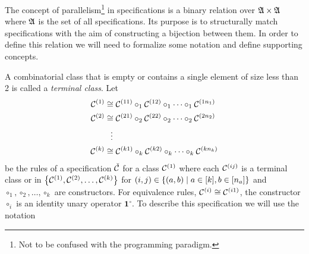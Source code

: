 \label{ch:parallel}
The concept of parallelism\footnote{Not to be confused with the programming paradigm.} in specifications is a binary relation over $\mathfrak{A} \times \mathfrak{A}$ where $\mathfrak{A}$ is the set of all specifications. Its purpose is to structurally match specifications with the aim of constructing a bijection between them. In order to define this relation  we will need to formalize some notation and define supporting concepts.

A combinatorial class that is empty or contains a single element of size less than 2 is called a \emph{terminal class}. Let
\begin{align*}
    \mathcal{C}^{\left(1\right)} &\cong \mathcal{C}^{\left(11\right)} \circ_1 \mathcal{C}^{\left(12\right)} \circ_1 \dotsm \circ_1 \mathcal{C}^{\left(1n_1\right)}\\
    \mathcal{C}^{\left(2\right)} &\cong \mathcal{C}^{\left(21\right)} \circ_2 \mathcal{C}^{\left(22\right)} \circ_2 \dotsm \circ_2 \mathcal{C}^{\left(2n_2\right)}\\
    &\hspace{0.25cm}\vdots\\
    \mathcal{C}^{\left(k\right)} &\cong \mathcal{C}^{\left(k1\right)} \circ_k \mathcal{C}^{\left(k2\right)} \circ_k \dotsm \circ_k \mathcal{C}^{\left(kn_k\right)}\\
\end{align*}
be the rules of a specification $\check{\mathcal{C}}$ for a class $\mathcal{C}^{\left(1\right)}$ where each $\mathcal{C}^{\left(ij\right)}$ is a terminal class or in $\left\{\mathcal{C}^{\left(1\right)}, \mathcal{C}^{\left(2\right)}, \dotsc, \mathcal{C}^{\left(k\right)}\right\}$ for $(i,j) \in \left\{(a,b) \mid a \in [k], b \in [n_a]\right\}$ and $\circ_1,\circ_2,\dotsc,\circ_k$ are constructors. For equivalence rules, $\mathcal{C}^{\left(i\right)} \cong \mathcal{C}^{\left(i1\right)}$, the constructor $\circ_i$ is an identity unary operator $\mathbf{1}^\circ$. To describe this specification we will use the notation 

